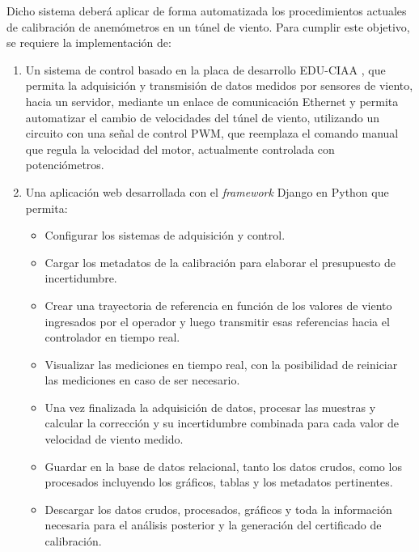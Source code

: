 Dicho sistema deberá aplicar de forma automatizada los procedimientos actuales de calibración de anemómetros en un túnel de viento. Para cumplir este objetivo, se requiere la implementación de:
\begin{enumerate}
    \item Un sistema de control basado en la placa de desarrollo EDU-CIAA \cite{proyectoCIAA}, que permita la adquisición y transmisión de datos medidos por sensores de viento, hacia un servidor, mediante un enlace de comunicación Ethernet y permita automatizar el cambio de velocidades del túnel de viento, utilizando un circuito con una señal de control PWM, que reemplaza el comando manual que regula la velocidad del motor, actualmente controlada con potenciómetros.
     
    \item Una aplicación web desarrollada con el \textit{framework} Django en Python que permita:
    \begin{itemize}
        \item Configurar los sistemas de adquisición y control.
        \item Cargar los metadatos de la calibración para elaborar el presupuesto de incertidumbre.
        \item Crear una trayectoria de referencia en función de los valores de viento ingresados por el operador y luego transmitir esas referencias hacia el controlador en tiempo real.
        \item Visualizar las mediciones en tiempo real, con la posibilidad de reiniciar las mediciones en caso de ser necesario.
        \item Una vez finalizada la adquisición de datos, procesar las muestras y calcular la corrección y su incertidumbre combinada para cada valor de velocidad de viento medido.
        \item Guardar en la base de datos relacional, tanto los datos crudos, como los procesados incluyendo los gráficos, tablas y los metadatos pertinentes.
        \item Descargar los datos crudos, procesados, gráficos y toda la información necesaria para el análisis posterior y la generación del certificado de calibración.
    \end{itemize}
\end{enumerate}

